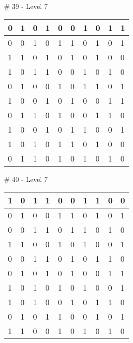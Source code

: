 \smallskip

\# 39 - Level 7 \newline
\begin{tabular}{|m{\collen}|m{\collen}|m{\collen}|m{\collen}|m{\collen}|m{\collen}|m{\collen}|m{\collen}|m{\collen}|m{\collen}|}
\hline
  0 & 1 & 0 & 1 & 0 & 0 & 1 & 0 & 1 & 1 \\
\hline
  0 & 0 & 1 & 0 & 1 & 1 & 0 & 1 & 0 & 1 \\
\hline
  1 & 1 & 0 & 1 & 0 & 1 & 0 & 1 & 0 & 0 \\
\hline
  1 & 0 & 1 & 1 & 0 & 0 & 1 & 0 & 1 & 0 \\
\hline
  0 & 1 & 0 & 0 & 1 & 0 & 1 & 1 & 0 & 1 \\
\hline
  1 & 0 & 0 & 1 & 0 & 1 & 0 & 0 & 1 & 1 \\
\hline
  0 & 1 & 1 & 0 & 1 & 0 & 0 & 1 & 1 & 0 \\
\hline
  1 & 0 & 0 & 1 & 0 & 1 & 1 & 0 & 0 & 1 \\
\hline
  1 & 0 & 1 & 0 & 1 & 1 & 0 & 1 & 0 & 0 \\
\hline
  0 & 1 & 1 & 0 & 1 & 0 & 1 & 0 & 1 & 0 \\
\hline
\end{tabular}


\smallskip

\# 40 - Level 7 \newline
\begin{tabular}{|m{\collen}|m{\collen}|m{\collen}|m{\collen}|m{\collen}|m{\collen}|m{\collen}|m{\collen}|m{\collen}|m{\collen}|}
\hline
  1 & 0 & 1 & 1 & 0 & 0 & 1 & 1 & 0 & 0 \\
\hline
  0 & 1 & 0 & 0 & 1 & 1 & 0 & 1 & 0 & 1 \\
\hline
  0 & 0 & 1 & 1 & 0 & 1 & 1 & 0 & 1 & 0 \\
\hline
  1 & 1 & 0 & 0 & 1 & 0 & 1 & 0 & 0 & 1 \\
\hline
  0 & 0 & 1 & 1 & 0 & 1 & 0 & 1 & 1 & 0 \\
\hline
  0 & 1 & 0 & 1 & 0 & 1 & 0 & 0 & 1 & 1 \\
\hline
  1 & 0 & 1 & 0 & 1 & 0 & 1 & 0 & 0 & 1 \\
\hline
  1 & 0 & 1 & 0 & 0 & 1 & 0 & 1 & 1 & 0 \\
\hline
  0 & 1 & 0 & 1 & 1 & 0 & 0 & 1 & 0 & 1 \\
\hline
  1 & 1 & 0 & 0 & 1 & 0 & 1 & 0 & 1 & 0 \\
\hline
\end{tabular}


\smallskip

